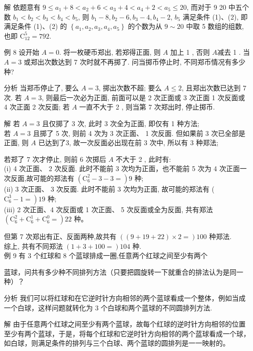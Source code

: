 \documentclass[10pt]{article}
\begin{document}
解 依题意有 $9 \leqslant a_{1}+8<a_{2}+6<a_{3}+4<a_{4}+2<a_{5} \leqslant 20$, 而对于 9 20 中五个数 $b_{1}<b_{2}<b_{3}<b_{4}<b_{5}$, 则 $b_{1}-8, b_{2}-6, b_{3}-4, b_{4}-2$, $b_{5}$ 满足条件 (1)、(2), 即满足条件 (1)、(2) 的 $\left\{a_{1}, a_{2}, a_{3}, a_{4}, a_{5}\right\}$ 的个数为从 $9 \sim 20$ 中取 5 数组的组数, 也即 $\mathrm{C}_{12}^{5}=792$.

例 8 设开始 $A=0$. 将一枚硬币郑出, 若郑得正面, 则 $A$ 加上 1 , 否则 $A$减去 1 . 当 $A=3$ 或郑出次数达到 7 次时就不再掷了. 问当掷币停止时, 不同郑币情况有多少种?

分析 当郑币停止了, 要么 $A=3$, 掷出次数不超; 要么 $A \leqslant 2$, 且郑出次数已达到 7 次. 若 $A=3$, 则最后一次必为正面, 前面可以是 2 次正面或 3 次正面 1 次反面或 4 次正面 2 次反面; 若 $A$ 一直不大于 2 , 则当第 7 次郑出时, 停止掷币.

解 若 $A=3$ 且仅掷了 3 次, 此时 3 次全为正面, 即仅有 1 种方法;\\
若 $A=3$ 且掷了 5 次, 则前 4 次为 3 次正面、 1 次反面. 但如果前 3 次已全部是正面, 则 $A$ 已达到了3, 故一次反面必出现在前 3 次中, 所以有 3 种郑法;

若郑了 7 次才停止, 则前 6 次掷后 $A$ 不大于 2 , 此时有:\\
(i) 4 次正面、 2 次反面. 此时不能前 3 次均为正面，也不能前 5 次为 4 次正面一次反面,故可能的郑法有 $\left(\mathrm{C}_{6}^{2}-3-3=\right) 9$ 种;\\
(ii) 3 次正面、 3 次反面. 此时不能前 3 次均为正面, 故可能的郑法有 ( $\left.\mathrm{C}_{6}^{3}-1=\right) 19$ 种;\\
(iii) 2 次正面、4 次反面或 1 次正面、 5 次反面或全为反面, 共有郑法 $\left(\mathrm{C}_{6}^{2}+\mathrm{C}_{6}^{1}+\mathrm{C}_{6}^{0}=\right) 22$ 种。

但第 7 次郑出有正、反面两种,故共有 $((9+19+22) \times 2=) 100$ 种郑法.\\
综上, 共有不同郑法 $(1+3+100=) 104$ 种.\\
例 9 有 3 个红球和 8 个蓝球排成一圈,任意两个红球之间至少有两个

蓝球，问共有多少种不同排列方法（只要把圆旋转一下就重合的排法认为是同一种）？

分析 我们可以将红球和在它逆时针方向相邻的两个蓝球看成一个整体，例如当成一个白球，这样问题就转化为 3 个白球和两个蓝球的不同圆排列方法.

解 由于任意两个红球之间至少有两个蓝球，故每个红球的逆时针方向相邻的位置至少有两个蓝球，于是，将每个红球和它逆时针方向相邻的两个蓝球看成一个球，如白球，则满足条件的排列与三个白球、两个蓝球的圆排列是一一映射的。
\end{document}
